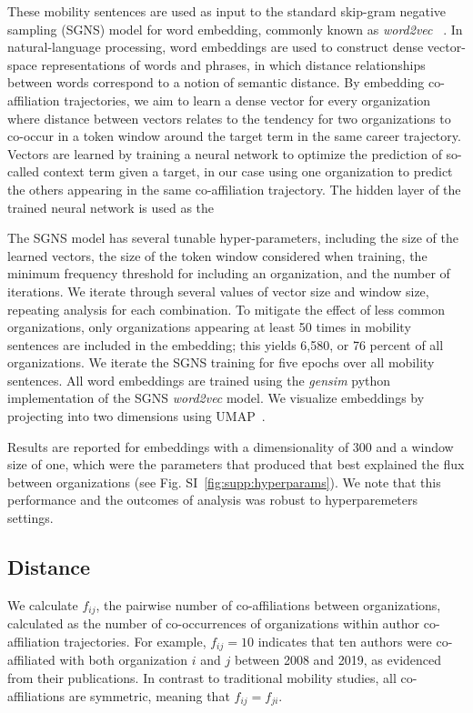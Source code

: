\documentclass[12pt]{article} %
\begin{document}
These mobility sentences are used as input to the standard skip-gram negative sampling (SGNS) model for word embedding, commonly known as \textit{word2vec}~\autocite{mikolov2013word2vec} . 
In natural-language processing, word embeddings are used to construct dense vector-space representations of words and phrases, in which distance relationships between words correspond to a notion of semantic distance. 
By embedding co-affiliation trajectories, we aim to learn a dense vector for every organization where distance between vectors relates to the tendency for two organizations to co-occur in a token window around the target term in the same career trajectory. 
Vectors are learned by training a neural network to optimize the prediction of so-called context term given a target, in our case using one organization to predict the others appearing in the same co-affiliation trajectory. 
The hidden layer of the trained neural network is used as the 

The SGNS model has several tunable hyper-parameters, including the size of the learned vectors, the size of the token window  considered when training, the minimum frequency threshold for including an organization, and the number of iterations.
We iterate through several values of vector size and window size, repeating analysis for each combination. 
To mitigate the effect of less common organizations, only organizations appearing at least 50 times in mobility sentences are included in the embedding;
this yields 6,580, or 76 percent of all organizations.
We iterate the SGNS training for five epochs over all mobility sentences. 
All word embeddings are trained using the \textit{gensim} python implementation of the SGNS \textit{word2vec} model. 
We visualize embeddings by projecting into two dimensions using UMAP~\autocite{mcinnes2018umap}.


Results are reported for embeddings with a dimensionality of 300 and a window size of one, which were the parameters that produced  that best explained the flux between organizations (see Fig. SI~\ref{fig:supp:hyperparams}). 
We note that this performance and the outcomes of analysis was robust to hyperparemeters settings. 


%
%
\subsection{Distance}
We calculate $f_{ij}$, the pairwise number of co-affiliations between organizations, calculated as the number of co-occurrences of organizations within author co-affiliation trajectories. 
For example, $f_{ij} = 10$ indicates that ten authors were co-affiliated with both organization $i$ and $j$ between 2008 and 2019, as evidenced from their publications. 
In contrast to traditional mobility studies, all co-affiliations are symmetric, meaning that $f_{ij} = f_{ji}$. 
\end{document}

